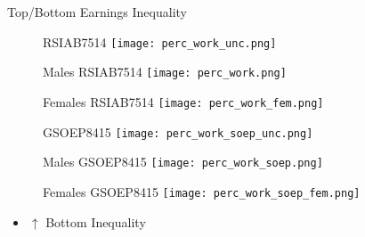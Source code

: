 \documentclass{beamer}
\begin{document}
\begin{frame}{Top/Bottom Earnings Inequality}
\begin{figure}[!t]
\centering
\begin{minipage}[b]{0.32\textwidth}{RSIAB7514}
\centering
\texttt{[image: perc\_work\_unc.png]}
\end{minipage}
\begin{minipage}[b]{0.32\textwidth}{Males RSIAB7514}
\centering
\texttt{[image: perc\_work.png]}
\end{minipage}
\begin{minipage}[b]{0.32\textwidth}{Females RSIAB7514}
\centering
\texttt{[image: perc\_work\_fem.png]}
\end{minipage}
\begin{minipage}[b]{0.32\textwidth}{GSOEP8415}
\centering
\texttt{[image: perc\_work\_soep\_unc.png]}
\end{minipage}
\begin{minipage}[b]{0.32\textwidth}{Males GSOEP8415}
\centering
\texttt{[image: perc\_work\_soep.png]}
\end{minipage}
\begin{minipage}[b]{0.32\textwidth}{Females GSOEP8415}
\centering
\texttt{[image: perc\_work\_soep\_fem.png]}
\end{minipage}
\end{figure}
\begin{itemize}
\setlength{\itemsep}{0.7 cm}
\item $\uparrow$ Bottom Inequality
\end{itemize}
\end{frame}

\end{document}
